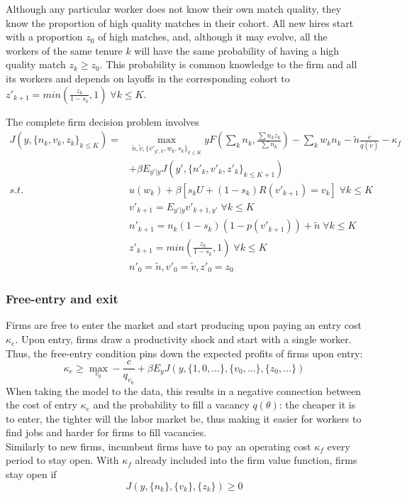 Although any particular worker does not know their own match quality, they know the proportion of high quality matches in their cohort. All new hires start with a proportion $z_0$ of high matches, and, although it may evolve, all the workers of the same tenure $k$ will have the same probability of having a high quality match $z_k\geq z_0$. This probability is common knowledge to the firm and all its workers and depends on layoffs in the corresponding cohort to $z'_{k+1}=min(\frac{z_k}{1-s_k},1)\; \forall k\leq K$.
\\
\begin{definition} \label{firmproblem}
The complete firm decision problem involves
\begin{equation*}
    \begin{split}
 J(y,\{n_k,v_k,z_k\}_{k\leq K}) =
    & \max_{\tilde{n},\tilde{v},\{v'_{y',k},w_{k},s_{k}\}_{k\leq K}} 
    yF(\sum_k n_k,\frac{\sum n_kz_k}{\sum n_k})-
    \sum_k w_kn_k
    -\tilde{n}\frac{c}{q(\tilde{v})}-\kappa_f \\
    & +\beta E_{y'|y} J(y',\{n'_k,v'_k,z'_k\}_{k\leq K+1}) \\
     s.t. \: & u(w_k) + \beta [s_k U + (1-s_k)R(v'_{k+1})=v_k] \; \forall k\leq K \\
    & v'_{k+1} = E_{y'|y} v'_{k+1,y'} \; \forall k\leq K \\
    & n'_{k+1} = n_k(1-s_k)(1-p(v'_{k+1}))+\tilde{n}\; \forall k\leq K \\
    & z'_{k+1} = min(\frac{z_k}{1-s_k},1)\; \forall k\leq K \\
    & n'_0 = \tilde{n}, v'_0 = \tilde{v}, z'_0 = z_0
    \end{split}
\end{equation*}
\end{definition}


\subsubsection*{Free-entry and exit}
Firms are free to enter the market and start producing upon paying an entry cost $\kappa_e$. Upon entry, firms draw a productivity shock and start with a single worker. Thus, the free-entry condition pins down the expected profits of firms upon entry:
\begin{equation} \label{freeentry}
    \kappa_e\geq \max_{v_0} -\frac{c}{q_{v_0}}+\beta E_y J(y,\{1,0,...\},\{v_0,...\},\{z_0,...\})
\end{equation}
When taking the model to the data, this results in a negative connection between the cost of entry $\kappa_e$ and the probability to fill a vacancy $q(\theta)$: the cheaper it is to enter, the tighter will the labor market be, thus making it easier for workers to find jobs and harder for firms to fill vacancies.
\\
Similarly to new firms, incumbent firms have to pay an operating cost $\kappa_f$ every period to stay open. With $\kappa_f$ already included into the firm value function, firms stay open if 
\begin{equation} \label{freeexit}
    J(y,\{n_k\},\{v_k\},\{z_k\})\geq 0
\end{equation}

